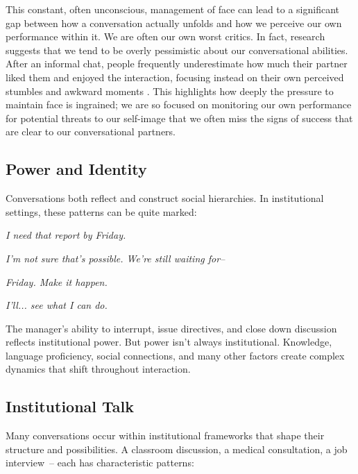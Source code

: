 This constant, often unconscious, management of face can lead to a significant gap between how a conversation actually unfolds and how we perceive our own performance within it. We are often our own worst critics. In fact, research suggests that we tend to be overly pessimistic about our conversational abilities. After an informal chat, people frequently underestimate how much their partner liked them and enjoyed the interaction, focusing instead on their own perceived stumbles and awkward moments \citep{welker2023pessimistic}. This highlights how deeply the pressure to maintain face is ingrained; we are so focused on monitoring our own performance for potential threats to our self-image that we often miss the signs of success that are clear to our conversational partners.

\subsection{Power and Identity} \label{subsec:power}

Conversations both reflect and construct social hierarchies. In institutional settings, these patterns can be quite marked:

\ea
\begin{dialogue}
\item[Manager] \textit{I need that report by Friday.}
\item[Employee] \textit{I'm not sure that's possible. We're still waiting for--}
\item[Manager] \textit{Friday. Make it happen.}
\item[Employee] \textit{I'll... see what I can do.}
\end{dialogue}
\z
The manager's ability to interrupt, issue directives, and close down discussion reflects institutional power. But power isn't always institutional. Knowledge, language proficiency, social connections, and many other factors create complex dynamics that shift throughout interaction.

\subsection{Institutional Talk} \label{subsec:institutional}

Many conversations occur within institutional frameworks that shape their structure and possibilities. A classroom discussion, a medical consultation, a job interview~-- each has characteristic patterns:

